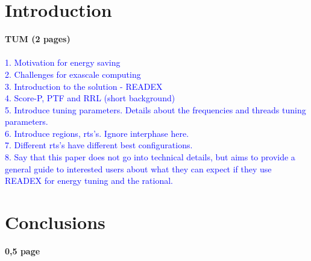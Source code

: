 \documentclass[runningheads]{llncs}
\begin{document}
\section{Introduction} \label{sec:introduction}
\textbf{TUM (2 pages)} \\ \\
\textcolor{blue}{1. Motivation for energy saving \\
2. Challenges for exascale computing \\
3. Introduction to the solution - READEX \\
4. Score-P, PTF and RRL (short background) \\
5. Introduce tuning parameters. Details about the frequencies and threads tuning parameters.  \\
6. Introduce regions, rts's. Ignore interphase here. \\
7. Different rts's have different best configurations. \\
8. Say that this paper does not go into technical details, but aims to provide a general guide to interested users about what they can expect if they use READEX for energy tuning and the rational. }

















\section{Conclusions} \label{sec:conclusions}
\textbf{0,5 page}



%
 
 
\end{document}
